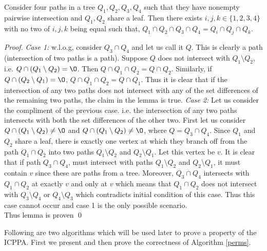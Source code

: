 \documentclass{llncs}
\begin{document}
\begin{lemma}
  \label{lem:fourpaths} Consider four paths in a tree $Q_1, Q_2, Q_3,
  Q_4$ such that they have nonempty pairwise intersection and $Q_1,
  Q_2$ share a leaf. Then there exists $i, j, k \in \{1,2,3,4\}$ with no two of $i,j,k$
  being equal such that, $Q_1 \cap Q_2 \cap Q_3 \cap Q_4 = Q_i \cap
  Q_j \cap Q_k$.
\end{lemma}
\begin{proof}
  {\em Case 1:} w.l.o.g, consider $Q_3 \cap Q_4$ and let us call it $Q$. This is clearly a
  path (intersection of two paths is a path). 
  Suppose $Q$
  does not intersect with $Q_1 \setminus Q_2$, i.e. $Q \cap (Q_1
  \setminus Q_2) = \O$. Then $Q \cap
  Q_1 \cap Q_2 = Q \cap Q_2$. Similarly, if $Q \cap (Q_2 \setminus
  Q_1) = \O$, $Q \cap Q_1 \cap Q_2 = Q \cap Q_1$. Thus it is
  clear that if the intersection of any two paths does not intersect
  with any of the set differences of the remaining two paths, the
  claim in the lemma is true. 
  {\em Case 2:} Let us consider the compliment of the previous case. i.e. the
  intersection of any two paths intersects with both the set
  differences of the other two. First let us consider $Q \cap (Q_1 \setminus Q_2) \ne
  \O$ and $Q \cap (Q_1 \setminus Q_2) \ne \O$, where $Q = Q_3 \cap
  Q_4$. Since $Q_1$ and
  $Q_2$ share a leaf, there is exactly one vertex at which they branch
  off from the path $Q_1 \cap Q_2$ into two paths $Q_1 \setminus Q_2$
  and $Q_2 \setminus Q_1$. Let this vertex be $v$. It is clear that if
  path $Q_3 \cap Q_4$, must intersect with paths $Q_1 \setminus Q_2$
  and $Q_2 \setminus Q_1$, it must contain $v$ since these are paths
  from a tree. Moreover, $Q_3 \cap Q_4$ intersects with $Q_1 \cap
  Q_2$ at exactly $v$ and only at $v$ which means that $Q_1 \cap Q_2$
  does not intersect with $Q_3 \setminus Q_4$ or $Q_4 \setminus Q_3$
  which contradicts initial condition of this case. Thus this
  case cannot occur and case 1 is the only possible scenario. \\
  Thus lemma is proven \qed
\end{proof}


\noindent
Following are two algorithms which will be used later to prove a
property of the ICPPA.
First we present and then prove the
  correctness of Algorithm \ref{perms}.
\end{document}
